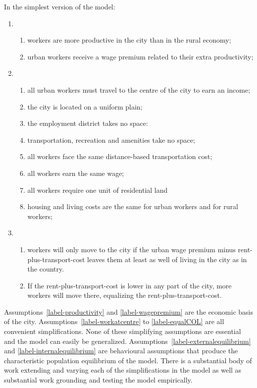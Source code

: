 In the simplest version of the model:
\begin{enumerate}
    \item 
    \begin{enumerate}\item \label{label-productivity}workers are more productive in the city than in the rural economy;
    \item \label{label-wagepremium}urban  workers receive a wage premium related to their extra productivity;  
    \end{enumerate}
    \item \begin{enumerate}\item\label{label-workatcentre}all urban workers must travel to the centre of the city to earn an income;
    \item \label{label-uniformplain}the city is located on a uniform plain; 
    \item \label{label-emplymentspace}the employment district takes no space:
    \item \label{label-transportspace}transportation, recreation and amenities take no space;
    \item \label{label-equaltransportcost}all workers face the same distance-based transportation cost;
    \item \label{label-equalwage}all workers earn the same wage;
    \item \label{label-equalland}all workers require one unit of residential land
    \item \label{label-equalCOL}housing and living costs are the same for urban workers and for rural workers;
    \end{enumerate}
    \item \begin{enumerate}\item\label{label-externalequilibrium}workers will only move to the city if the \gls{urban wage premium} minus rent-plus-transport-cost leaves them at least as well of living in the city as in the country.
    \item \label{label-internalequilibrium}If the rent-plus-transport-cost is lower in any part of the city, more workers will move there, equalizing the rent-plus-transport-cost.
    \end{enumerate}
\end{enumerate}

Assumptions~\ref{label-productivity} and \ref{label-wagepremium} are the economic basis of the city. Assumptions~\ref{label-workatcentre}  to \ref{label-equalCOL} are all convenient simplifications. None of these simplifying assumptions are essential and the model can easily be generalized. %
Assumptions~\ref{label-externalequilibrium} and \ref{label-internalequilibrium} are behavioural assumptions that produce the characteristic population \gls{equilibrium} of the model. There is a substantial body of work extending and varying each of the simplifications in the model as well as substantial work grounding and testing the model empirically.


